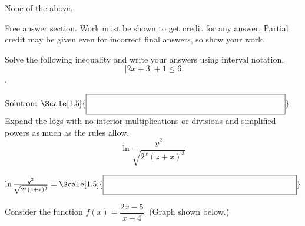 \begin{questions}
\begin{choices}
      \centering \choice \chooseone None of the above.
    \end{choices}

\newpage
\hspace{-.5in}Free answer section. Work must be shown to get credit for any answer. Partial credit may be given even for incorrect final answers, so show your work.



\question[6] Solve the following inequality and write your answers using interval notation.
    \[|2x+3|+1 \leq 6\].
    \vfill\vfill

    $ \mbox{Solution: } \Scale[1.5]{\boxed{ \phantom{\dfrac{a}{b}} \hspace{8cm} }}$
\question[4] Expand the logs with no interior multiplications or divisions and simplified powers as much as the rules allow.
    \[ \ln \frac{y^2}{\sqrt{2^x (z+x)^3}} \]
     
    \vfill
$
            \ln \frac{y^2}{\sqrt{2^x (z+x)^3}}= \Scale[1.5]{\boxed{ \phantom{\dfrac{a}{b}} \hspace{8cm} }}
            $
\newpage

\question%
    Consider the function $f(x)=\dfrac{2x-5}{x+4}$. (Graph shown below.)


\end{questions}
